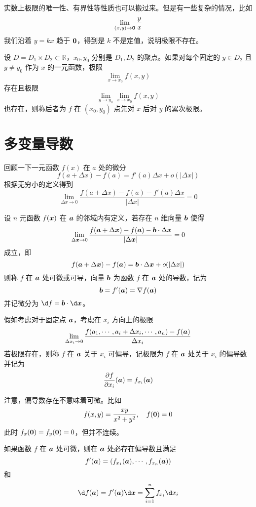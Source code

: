 实数上极限的唯一性、有界性等性质也可以搬过来。但是有一些复杂的情况，比如
\[ \lim_{(x, y) \to \boldsymbol{0}} \frac{y}{x} \]
我们沿着 $y = kx$ 趋于 $\boldsymbol{0}$，得到是 $k$ 不是定值，说明极限不存在。

\begin{definition}
	设 $D = D_1 \times D_2 \subset \mathbb{R}$，$x_0, y_0$ 分别是 $D_1, D_2$ 的聚点。如果对每个固定的 $y \in D_2$ 且 $y \neq y_0$ 作为 $x$ 的一元函数，极限
	\[ \lim_{x \to x_0} f(x, y) \]
	存在且极限
	\[ \lim_{y \to y_0} \lim_{x \to x_0} f(x, y) \]
	也存在，则称后者为 $f$ 在 $(x_0, y_0)$ 点先对 $x$ 后对 $y$ 的累次极限。
\end{definition}

\section{多变量导数}

回顾一下一元函数 $f(x)$ 在 $a$ 处的微分
\[ f(a + \Delta x) - f(a) = f'(a) \Delta x + o(|\Delta x|) \]
根据无穷小的定义得到
\[ \lim_{\Delta x \to 0} \frac{f(a + \Delta x) - f(a) - f'(a) \Delta x}{|\Delta x|} = 0 \]

\begin{definition}
	设 $n$ 元函数 $f(\boldsymbol{x})$ 在 $\boldsymbol{a}$ 的邻域内有定义，若存在 $n$ 维向量 $\boldsymbol{b}$ 使得
	\[ \lim_{\Delta \boldsymbol{x} \to 0} \frac{f(\boldsymbol{a} + \Delta \boldsymbol{x}) - f(\boldsymbol{a}) - \boldsymbol{b} \cdot \Delta \boldsymbol{x}}{|\Delta \boldsymbol{x}|} = 0 \]
	成立，即
	\[ f(\boldsymbol{a} + \Delta \boldsymbol{x}) - f(\boldsymbol{a}) = \boldsymbol{b} \cdot \Delta \boldsymbol{x} + o(|\Delta x|) \]
	则称 $f$ 在 $\boldsymbol{a}$ 处可微或可导，向量 $\boldsymbol{b}$ 为函数 $f$ 在 $\boldsymbol{a}$ 处的导数，记为
	\[ \boldsymbol{b} = f'(\boldsymbol{a}) = \nabla f(\boldsymbol{a}) \]
	并记微分为 $\d f = \vbf{b} \cdot \d \vbf{x}$。
\end{definition}

假如考虑对于固定点 $\boldsymbol{a}$，考虑在 $x_i$ 方向上的极限
\[ \lim_{\Delta x_i \to 0} \frac{f(a_1, \cdots, a_i + \Delta x_i, \cdots, a_n) - f(\boldsymbol{a})}{\Delta x_i} \]
若极限存在，则称 $f$ 在 $\boldsymbol{a}$ 关于 $x_i$ 可偏导，记极限为 $f$ 在 $\boldsymbol{a}$ 处关于 $x_i$ 的偏导数并记为
\[ \frac{\partial f}{\partial x_i}(\boldsymbol{a}) = f_{x_i}(\boldsymbol{a}) \] 

注意，偏导数存在不意味着可微。比如
\[ f(x, y) = \frac{xy}{x^2 + y^2}, \quad f(\boldsymbol{0}) = 0 \]
此时 $f_x(\boldsymbol{0}) = f_y(\boldsymbol{0}) = 0$，但并不连续。

\begin{theorem}
	如果函数 $f$ 在 $\boldsymbol{a}$ 处可微，则在 $\boldsymbol{a}$ 处必存在偏导数且满足
	\[ f'(\boldsymbol{a}) = \left( f_{x_1}(\boldsymbol{a}), \cdots, f_{x_n}(\boldsymbol{a}) \right) \]
	和
	\[ \d f(\vbf{a}) = f'(\vbf{a}) \d \vbf{x} = \sum_{i=1}^n f_{x_i} \d x_i \]
\end{theorem}


